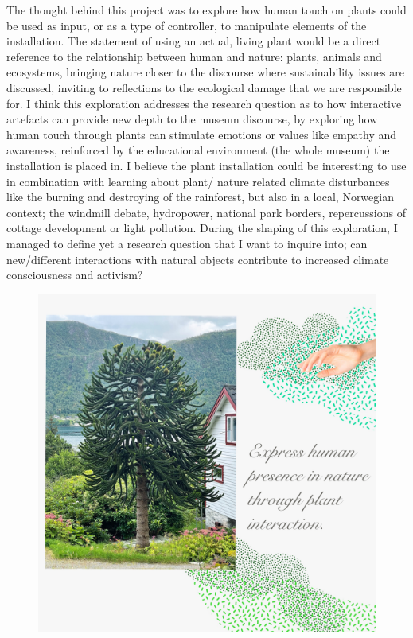 The thought behind this project was to explore how human touch on plants could be used as input, or as a type of controller, to manipulate elements of the installation. The statement of using an actual, living plant would be a direct reference to the relationship between human and nature: plants, animals and ecosystems, bringing nature closer to the discourse where sustainability issues are discussed, inviting to reflections to the ecological damage that we are responsible for. I think this exploration addresses the research question as to how interactive artefacts can provide new depth to the museum discourse, by exploring how human touch through plants can stimulate emotions or values like empathy and awareness, reinforced by the educational environment (the whole museum) the installation is placed in. I believe the plant installation could be interesting to use in combination with learning about plant/ nature related climate disturbances like the burning and destroying of the rainforest, but also in a local, Norwegian context; the windmill debate, hydropower, national park borders, repercussions of cottage development or light pollution. During the shaping of this exploration, I managed to define yet a research question that I want to inquire into; can new/different interactions with natural objects contribute to increased climate consciousness and activism?	

\begin{figure}[H]
\includegraphics[width=13cm]{pictures/human_presence.jpg}
\centering 
\end{figure}

